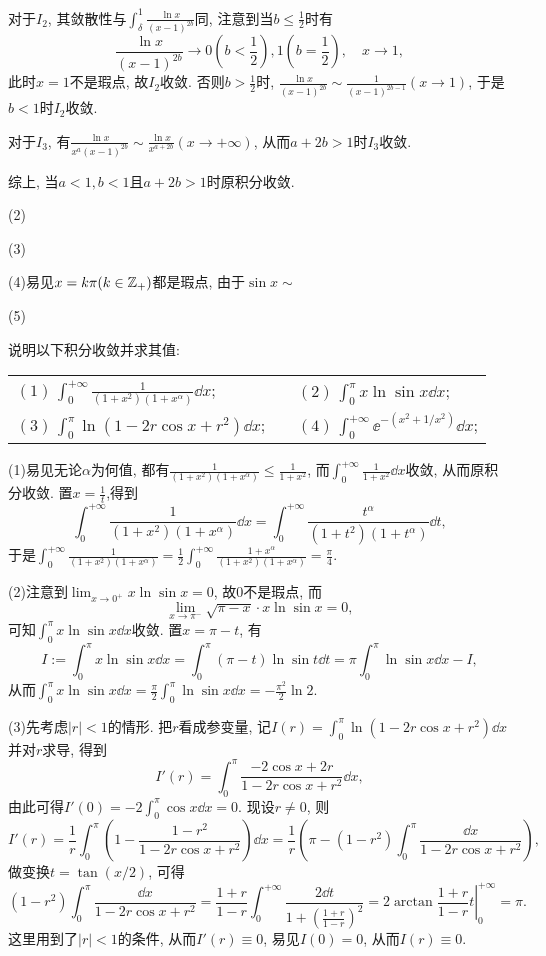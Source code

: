 \begin{quiza}
\begin{solution}
对于\(I_2\), 其敛散性与\(\int_{\delta}^{1}\frac{\ln x}{(x-1)^{2b}}\)同, 注意到当\(b\leqslant\frac{1}{2}\)时有\[\frac{\ln x}{(x-1)^{2b}}\rightarrow 0\left(b<\frac{1}{2}\right),1\left(b=\frac{1}{2}\right),\quad x\rightarrow 1,\]此时\(x=1\)不是瑕点, 故\(I_2\)收敛. 否则\(b>\frac{1}{2}\)时, \(\frac{\ln x}{(x-1)^{2b}}\sim\frac{1}{(x-1)^{2b-1}}(x\rightarrow 1)\), 于是\(b<1\)时\(I_2\)收敛.

对于\(I_3\), 有\(\frac{\ln x}{x^a(x-1)^{2b}}\sim\frac{\ln x}{x^{a+2b}}(x\rightarrow+\infty)\), 从而\(a+2b>1\)时\(I_3\)收敛.

综上, 当\(a<1,b<1\)且\(a+2b>1\)时原积分收敛.

(2)

(3)

(4)易见\(x=k\pi(k\in\mathbb{Z}_+)\)都是瑕点, 由于\(\sin x\sim\)

(5)
\end{solution}
\woe 说明以下积分收敛并求其值:\vspace{8pt}\\
\begin{tabular}{lcl}
\((1)\,\int_{0}^{+\infty}\frac{1}{(1+x^2)(1+x^\alpha)}\dd x\);&\qquad\qquad\qquad&\((2)\,\int_{0}^{\pi}x\ln\sin x\dd x\);\vspace{0.3cm}\\
\((3)\,\int_{0}^{\pi}\ln\left(1-2r\cos x+r^2\right)\dd x\);&&\((4)\,\int_{0}^{+\infty}\ee^{-\left(x^2+1/x^2\right)}\dd x\);\\
\end{tabular}
\begin{solution}
(1)易见无论\(\alpha\)为何值, 都有\(\frac{1}{(1+x^2)(1+x^\alpha)}\leqslant\frac{1}{1+x^2}\), 而\(\int_{0}^{+\infty}\frac{1}{1+x^2}\dd x\)收敛, 从而原积分收敛. 置\(x=\frac{1}{t}\),得到\[\int_{0}^{+\infty}\frac{1}{(1+x^2)(1+x^\alpha)}\dd x=\int_{0}^{+\infty}\frac{t^\alpha}{(1+t^2)(1+t^\alpha)}\dd t,\]于是\(\int_{0}^{+\infty}\frac{1}{(1+x^2)(1+x^\alpha)}=\frac{1}{2}\int_{0}^{+\infty}\frac{1+x^\alpha}{(1+x^2)(1+x^\alpha)}=\frac{\pi}{4}\).

(2)注意到\(\lim_{x\rightarrow 0^+}x\ln\sin x=0\), 故\(0\)不是瑕点, 而\[\lim_{x\rightarrow \pi^-}\sqrt{\pi-x}\cdot x\ln\sin x=0,\]可知\(\int_{0}^{\pi}x\ln\sin x\dd x\)收敛. 置\(x=\pi-t\), 有\[I:=\int_{0}^{\pi}x\ln\sin x\dd x=\int_{0}^{\pi}(\pi-t)\ln\sin t\dd t=\pi\int_{0}^{\pi}\ln\sin x\dd x-I,\]从而\(\int_{0}^{\pi}x\ln\sin x\dd x=\frac{\pi}{2}\int_{0}^{\pi}\ln\sin x\dd x=-\frac{\pi^2}{2}\ln 2.\)

(3)先考虑\(\left|r\right|<1\)的情形. 把\(r\)看成参变量, 记\(I(r)=\int_{0}^{\pi}\ln\left(1-2r\cos x+r^2\right)\dd x\)并对\(r\)求导, 得到\[I'(r)=\int_{0}^{\pi}\frac{-2\cos x+2r}{1-2r\cos x+r^2}\dd x,\]由此可得\(I'(0)=-2\int_{0}^{\pi}\cos x\dd x=0\). 现设\(r\ne 0\), 则\[I'(r)=\frac{1}{r}\int_{0}^{\pi}\left(1-\frac{1-r^2}{1-2r\cos x+r^2}\right)\dd x=\frac{1}{r}\left(\pi-(1-r^2)\int_{0}^{\pi}\frac{\dd x}{1-2r\cos x+r^2}\right),\]做变换\(t=\tan\left(x/2\right)\), 可得\[(1-r^2)\int_{0}^{\pi}\frac{\dd x}{1-2r\cos x+r^2}=\frac{1+r}{1-r}\int_{0}^{+\infty}\frac{2\dd t}{1+\displaystyle\left(\frac{1+r}{1-r}\right)^2}=\left.2\arctan\frac{1+r}{1-r}t\right|^{+\infty}_0=\pi.\]这里用到了\(\left|r\right|<1\)的条件, 从而\(I'(r)\equiv 0\), 易见\(I(0)=0\), 从而\(I(r)\equiv 0\).


\end{solution}
\end{quiza}
